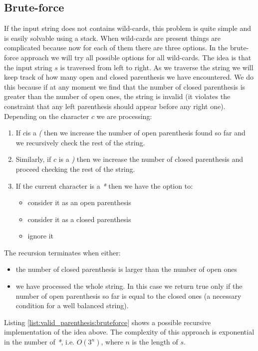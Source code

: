 \subsection{Brute-force}
\label{valid_parenthesis:sec:bruteforce}
If the input string does not contains  wild-cards, this problem is quite simple and  is easily solvable using a stack. When wild-cards are present things are complicated because now for each of them there are three options. In the brute-force approach we will try all possible options for all wild-cards. 
The idea is that the input string $s$ is traversed from left to right. As we traverse the string we will keep track of how many open  and closed  parenthesis we have encountered. We do this because if at any moment we find that the number of closed parenthesis is greater than the number of open ones, the string is invalid (it violates the constraint that any left parenthesis should appear before any right one). Depending on the character $c$ we are processing:
\begin{enumerate}
	\item If $c$is a \textit{(} then we increase the number of open parenthesis found so far and we recursively check the rest of the string. 
	\item Similarly, if $c$ is a \textit{)} then we increase the number of closed parenthesis and proceed checking the rest of the string. 
	\item If the current character is a \textit{*} then we have the option to:
	\begin{itemize}
		\item consider it as an open parenthesis
		\item  consider it as a closed parenthesis
		\item ignore it
	\end{itemize}
\end{enumerate}

The recursion terminates when either:
 \begin{itemize}
	\item the number of closed parenthesis is larger than the number of open ones
	\item  we have processed the whole string. In this case we return true only if the number of open parenthesis so far is equal to the closed ones (a necessary condition for a well balanced string).
\end{itemize}


Listing \ref{list:valid_parenthesis:bruteforce} shows a possible recursive implementation of the idea above. The complexity of this approach is exponential in the number of \textit{*}, i.e. $O(3^{n})$, where $n$ is the length of $s$.

